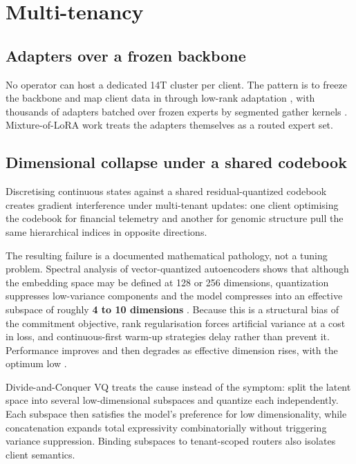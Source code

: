 \documentclass[11pt]{article}
\begin{document}
\section{Multi-tenancy}
\label{sec:multitenant}

\subsection{Adapters over a frozen backbone}

No operator can host a dedicated 14T cluster per client. The pattern is to freeze the backbone and map client data in through low-rank adaptation \cite{hu2021lora}, with thousands of adapters batched over frozen experts by segmented gather kernels \cite{chen2024punica,sheng2024slora}. Mixture-of-LoRA work \cite{zhang2024milora} treats the adapters themselves as a routed expert set.

\subsection{Dimensional collapse under a shared codebook}

Discretising continuous states against a shared residual-quantized codebook \cite{lee2022rqvae,rajput2023tiger} creates gradient interference under multi-tenant updates: one client optimising the codebook for financial telemetry and another for genomic structure pull the same hierarchical indices in opposite directions.

The resulting failure is a documented mathematical pathology, not a tuning problem. Spectral analysis of vector-quantized autoencoders shows that although the embedding space may be defined at 128 or 256 dimensions, quantization suppresses low-variance components and the model compresses into an effective subspace of roughly \textbf{4 to 10 dimensions} \cite{neurips2025dimcollapse}. Because this is a structural bias of the commitment objective, rank regularisation forces artificial variance at a cost in loss, and continuous-first warm-up strategies \cite{arxiv2026continuousfirst} delay rather than prevent it. Performance improves and then degrades as effective dimension rises, with the optimum low \cite{neurips2025dimcollapse}.

Divide-and-Conquer VQ \cite{neurips2025dimcollapse} treats the cause instead of the symptom: split the latent space into several low-dimensional subspaces and quantize each independently. Each subspace then satisfies the model's preference for low dimensionality, while concatenation expands total expressivity combinatorially without triggering variance suppression. Binding subspaces to tenant-scoped routers also isolates client semantics.
\end{document}
